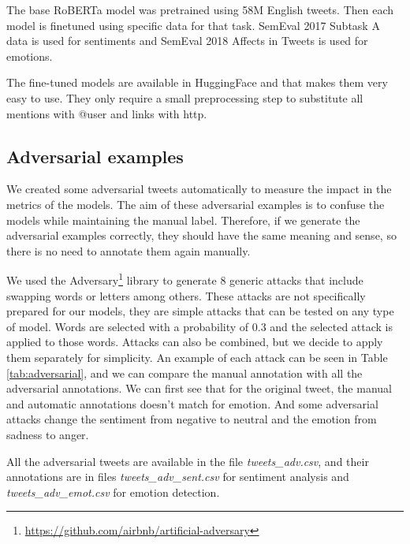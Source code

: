 \documentclass[11pt,a4paper]{article}
\begin{document}
The base RoBERTa \cite{liu2019roberta} model was pretrained using 58M English tweets. Then each model is finetuned using specific data for that task. SemEval 2017 Subtask A data \cite{rosenthal2019semeval} is used for sentiments and SemEval 2018 Affects in Tweets \cite{mohammad-etal-2018-semeval} is used for emotions.

The fine-tuned models are available in HuggingFace and that makes them very easy to use. They only require a small preprocessing step to substitute all mentions with @user and links with http.

\subsection{Adversarial examples}

We created some adversarial tweets automatically to measure the impact in the metrics of the models. The aim of these adversarial examples is to confuse the models while maintaining the manual label. Therefore, if we generate the adversarial examples correctly, they should have the same meaning and sense, so there is no need to annotate them again manually. 

We used the Adversary\footnote{\url{https://github.com/airbnb/artificial-adversary}} library to generate 8 generic attacks that include swapping words or letters among others. These attacks are not specifically prepared for our models, they are simple attacks that can be tested on any type of model. Words are selected with a probability of 0.3 and the selected attack is applied to those words. Attacks can also be combined, but we decide to apply them separately for simplicity. An example of each attack can be seen in Table \ref{tab:adversarial}, and we can compare the manual annotation with all the adversarial annotations. We can first see that for the original tweet, the manual and automatic annotations doesn't match for emotion. And some adversarial attacks change the sentiment from negative to neutral and the emotion from sadness to anger.

All the adversarial tweets are available in the file \textit{tweets\_adv.csv}, and their annotations are in files \textit{tweets\_adv\_sent.csv} for sentiment analysis and \textit{tweets\_adv\_emot.csv} for emotion detection.
\end{document}
